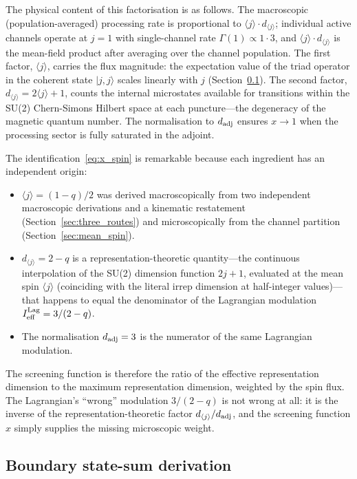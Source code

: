 \documentclass[aps,prd,twocolumn,10pt,superscriptaddress,nofootinbib]{revtex4-2}
\begin{document}
The physical content of this factorisation is as follows.  The
macroscopic (population-averaged) processing rate is proportional to
$\langle j \rangle \cdot d_{\langle j \rangle}$; individual active channels
operate at $j=1$ with single-channel rate $\Gamma(1) \propto 1 \cdot 3$,
and $\langle j \rangle \cdot d_{\langle j \rangle}$ is the mean-field product
after averaging over the channel population.  The first factor,
$\langle j \rangle$, carries the flux magnitude: the
expectation value of the triad operator in the coherent state
$|j, j\rangle$ scales linearly with $j$
(Section~\ref{sec:state_sum}).  The second factor,
$d_{\langle j \rangle} = 2\langle j \rangle + 1$, counts the
internal microstates available for transitions within the SU(2)
Chern-Simons Hilbert space at each puncture---the degeneracy of
the magnetic quantum number.  The normalisation to $d_{\rm adj}$
ensures $x \to 1$ when the processing sector is fully saturated
in the adjoint.

The identification~\eqref{eq:x_spin} is remarkable because each
ingredient has an independent origin:
\begin{itemize}
\item $\langle j \rangle = (1-q)/2$ was derived macroscopically
  from two independent macroscopic derivations and a kinematic restatement
  (Section~\ref{sec:three_routes}) and microscopically from the
  channel partition (Section~\ref{sec:mean_spin}).
\item $d_{\langle j \rangle} = 2-q$ is a representation-theoretic
  quantity---the continuous interpolation of the SU(2) dimension
  function $2j+1$, evaluated at the mean spin $\langle j \rangle$
  (coinciding with the literal irrep dimension at half-integer values)---that
  happens to equal the denominator of the Lagrangian
  modulation $I_{\rm eff}^{\rm Lag} = 3/(2-q)$.
\item The normalisation $d_{\rm adj} = 3$ is the numerator of the
  same Lagrangian modulation.
\end{itemize}
The screening function is therefore the ratio of the effective
representation dimension to the maximum representation dimension,
weighted by the spin flux.  The Lagrangian's ``wrong'' modulation
$3/(2-q)$ is not wrong at all: it is the inverse of the
representation-theoretic factor $d_{\langle j \rangle}/d_{\rm adj}$,
and the screening function $x$ simply supplies the missing
microscopic weight.


\subsection{Boundary state-sum derivation}
\label{sec:state_sum}
\end{document}
